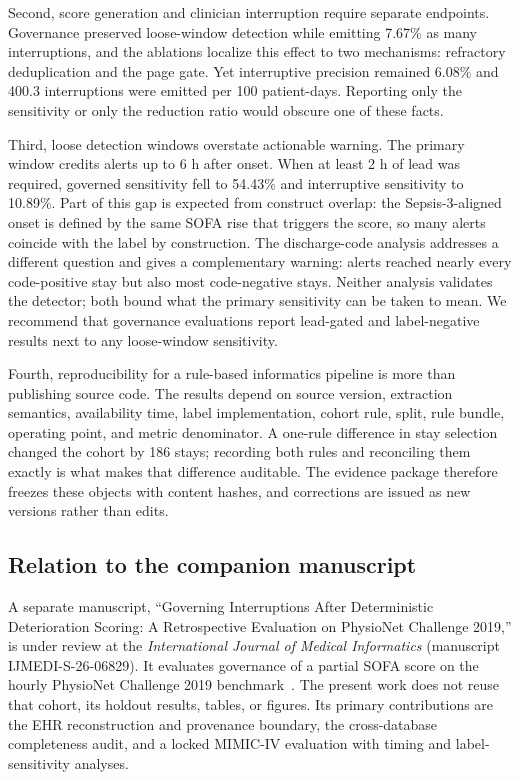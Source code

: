 \documentclass[journal]{IEEEtran}
\begin{document}
Second, score generation and clinician interruption require separate
endpoints. Governance preserved loose-window detection while emitting 7.67\%
as many interruptions, and the ablations localize this effect to two
mechanisms: refractory deduplication and the page gate. Yet interruptive
precision remained 6.08\% and 400.3 interruptions were emitted per 100
patient-days. Reporting only the sensitivity or only the reduction ratio would
obscure one of these facts.

Third, loose detection windows overstate actionable warning. The primary
window credits alerts up to 6 h after onset. When at least 2 h of lead was
required, governed sensitivity fell to 54.43\% and interruptive sensitivity to
10.89\%. Part of this gap is expected from construct overlap: the
Sepsis-3-aligned onset is defined by the same SOFA rise that triggers the
score, so many alerts coincide with the label by construction. The
discharge-code analysis addresses a different question and gives a
complementary warning: alerts reached nearly every code-positive stay but
also most code-negative stays. Neither analysis validates the detector; both
bound what the primary sensitivity can be taken to mean. We recommend that
governance evaluations report lead-gated and label-negative results next to
any loose-window sensitivity.

Fourth, reproducibility for a rule-based informatics pipeline is more than
publishing source code. The results depend on source version, extraction
semantics, availability time, label implementation, cohort rule, split, rule
bundle, operating point, and metric denominator. A one-rule difference in
stay selection changed the cohort by 186 stays; recording both rules and
reconciling them exactly is what makes that difference auditable. The
evidence package therefore freezes these objects with content hashes, and
corrections are issued as new versions rather than edits.

\subsection{Relation to the companion manuscript}

A separate manuscript, ``Governing Interruptions After Deterministic
Deterioration Scoring: A Retrospective Evaluation on PhysioNet Challenge
2019,'' is under review at the \emph{International Journal of Medical
Informatics} (manuscript IJMEDI-S-26-06829). It evaluates governance of a
partial SOFA score on the hourly PhysioNet Challenge 2019
benchmark~\cite{reyna2020}. The present work does not reuse that cohort, its
holdout results, tables, or figures. Its primary contributions are the EHR
reconstruction and provenance boundary, the cross-database completeness
audit, and a locked MIMIC-IV evaluation with timing and label-sensitivity
analyses.
\end{document}
